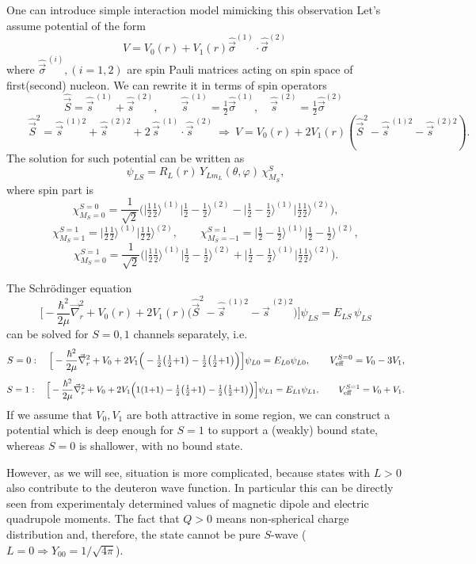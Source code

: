 \documentclass[11pt,a4paper]{article}
\newcommand{\op}[1]{\hat{#1}}
\begin{document}
One can introduce simple interaction model mimicking this observation
Let's assume potential of the form 
\[
V=V_0(r)+V_1(r) \op {\vec \sigma}^{(1)} \cdot \op {\vec \sigma}^{(2)}\
\]
where $\op {\vec \sigma}^{\,(i)}, (i=1,2) $ are spin Pauli matrices acting on spin space of first(second) nucleon. 
We can rewrite it in terms of spin operators
\[
\op {\vec S}=\op {\vec s}^{\,(1)}+\op {\vec s}^{\,(2)},
\qquad
\op {\vec s}^{\,(1)}=\tfrac12\op{\vec\sigma}^{(1)},\quad \op {\vec s}^{\,(2)}=\tfrac12\op{\vec\sigma}^{(2)}
\ \ 
\]
\[
\qquad
\op {\vec S}^2=\op {\vec s}^{\,(1)2}+\op {\vec s}^{\,(2)2}+2\,\op {\vec s}^{\,(1)}\!\cdot \op {\vec s}^{\,(2)}
\ \Rightarrow\
V=V_0(r)+2 V_1(r) ( \op {\vec S}^2- \op {\vec s} ^{\,(1)2}-\op {\vec s}^{\,(2)2}).
\]
The solution for such potential can be written as 
\[
\psi_{LS}=R_L(r)\,Y_{Lm_L}(\theta,\varphi)\,\chi^S_{M_S},
\]
where spin part is
\[
\chi^{S=0}_{M_S=0}=\frac{1}{\sqrt2}\Big(\big|\tfrac12\tfrac12\big\rangle^{(1)}\big|\tfrac12{-}\tfrac12\big\rangle^{(2)}
-\big|\tfrac12{-}\tfrac12\big\rangle^{(1)}\big|\tfrac12\tfrac12\big\rangle^{(2)}\Big),
\]
\[
\chi^{S=1}_{M_S=1}=\big|\tfrac12\tfrac12\big\rangle^{(1)}\big|\tfrac12\tfrac12\big\rangle^{(2)},\qquad
\chi^{S=1}_{M_S=-1}=\big|\tfrac12{-}\tfrac12\big\rangle^{(1)}\big|\tfrac12{-}\tfrac12\big\rangle^{(2)},
\]
\[
\chi^{S=1}_{M_S=0}=\frac{1}{\sqrt2}\Big(\big|\tfrac12\tfrac12\big\rangle^{(1)}\big|\tfrac12{-}\tfrac12\big\rangle^{(2)}
+\big|\tfrac12{-}\tfrac12\big\rangle^{(1)}\big|\tfrac12\tfrac12\big\rangle^{(2)}\Big).
\]

The Schr\"odinger equation
\[
\Big[-\frac{\hbar^2}{2\mu}\vec\nabla_r^2+V_0(r)+2V_1(r)\big( \op {\vec S}^2- \op {\vec s} ^{\,(1)2}- \op {\vec s}^{\,(2)2}\big)\Big]\psi_{LS}
=E_{LS}\,\psi_{LS}
\]
can be solved for $S=0,1$ channels separately, i.e. 
\[
S=0:\quad
\Big[-\frac{\hbar^2}{2\mu}\vec\nabla_r^2+V_0+2 V_1 \Big(-\tfrac12\big(\tfrac12{+}1\big)-\tfrac12\big(\tfrac12{+}1\big)\Big)\Big]\psi_{L0}=E_{L0}\psi_{L0},
\qquad
V_{\rm eff}^{S=0}=V_0-3V_1,
\]
\[
S=1:\quad
\Big[-\frac{\hbar^2}{2\mu}\vec\nabla_r^2+V_0+2 V_1\Big(1(1{+}1)-\tfrac12\big(\tfrac12{+}1\big)-\tfrac12\big(\tfrac12{+}1\big)\Big)\Big]\psi_{L1}=E_{L1}\psi_{L1},
\qquad
V_{\rm eff}^{S=1}=V_0+V_1 .
\]
If we assume that $V_0,V_1$ are both attractive in some region,  we can construct a potential which is deep enough for $S=1$ to support a (weakly) bound state, whereas $S=0$ is shallower, with no bound state.

However, as we will see, situation is more complicated, because states with $L>0$ also contribute to the deuteron wave function. In particular this can be directly seen from experimentaly determined values of magnetic dipole and electric quadrupole moments. The fact that $Q>0$ means non-spherical charge distribution and, therefore, the state cannot be pure $S$-wave ($L=0\Rightarrow Y_{00}=1/\sqrt{4\pi}$).
\end{document}
